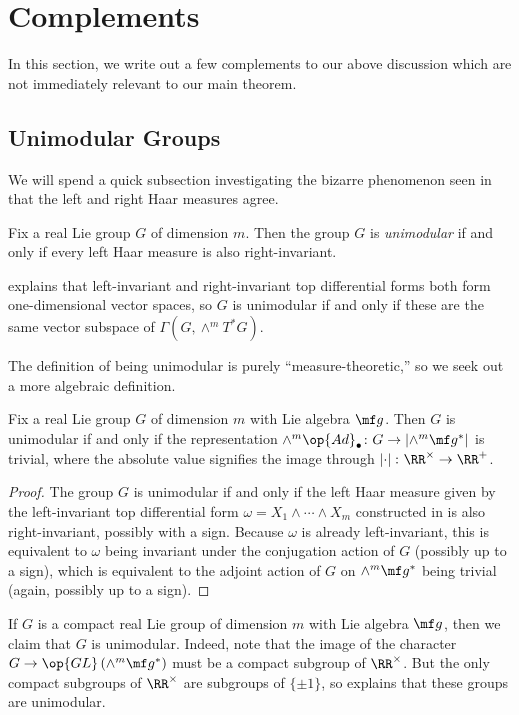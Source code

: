 \documentclass{amsart}
\begin{document}
\appendix
\section{Complements} \label{sec:comp}
In this section, we write out a few complements to our above discussion which are not immediately relevant to our main theorem.

\subsection{Unimodular Groups}
We will spend a quick subsection investigating the bizarre phenomenon seen in  that the left and right Haar measures agree.
\begin{definition}[unimodular]
	Fix a real Lie group $G$ of dimension $m$. Then the group $G$ is \textit{unimodular} if and only if every left Haar measure is also right-invariant.
\end{definition}
\begin{remark}
	 explains that left-invariant and right-invariant top differential forms both form one-dimensional vector spaces, so $G$ is unimodular if and only if these are the same vector subspace of $\Gamma(G,\land^mT^*G)$.
\end{remark}
The definition of being unimodular is purely ``measure-theoretic,'' so we seek out a more algebraic definition.
\begin{lemma} \label{lem:det-adjoint-for-unimodular}
	Fix a real Lie group $G$ of dimension $m$ with Lie algebra $\mf g$. Then $G$ is unimodular if and only if the representation $\land^m\op{Ad}_\bullet\colon G\to\left|\land^m\mf g^*\right|$ is trivial, where the absolute value signifies the image through $\left|\cdot\right|\colon\RR^\times\to\RR^+$.
\end{lemma}
\begin{proof}
	The group $G$ is unimodular if and only if the left Haar measure given by the left-invariant top differential form $\omega=X_1\land\cdots\land X_m$ constructed in  is also right-invariant, possibly with a sign. Because $\omega$ is already left-invariant, this is equivalent to $\omega$ being invariant under the conjugation action of $G$ (possibly up to a sign), which is equivalent to the adjoint action of $G$ on $\land^m\mf g^*$ being trivial (again, possibly up to a sign).
\end{proof}
\begin{example} \label{ex:compact-unimodular}
	If $G$ is a compact real Lie group of dimension $m$ with Lie algebra $\mf g$, then we claim that $G$ is unimodular. Indeed, note that the image of the character $G\to\op{GL}\left(\land^m\mf g^*\right)$ must be a compact subgroup of $\RR^\times$. But the only compact subgroups of $\RR^\times$ are subgroups of $\{\pm1\}$, so  explains that these groups are unimodular.
\end{example}
\end{document}
